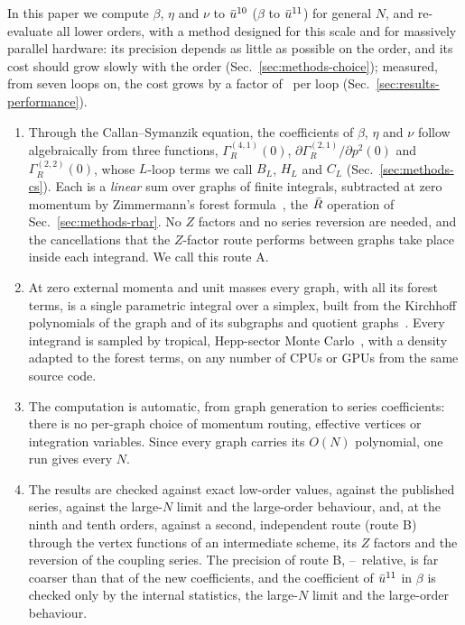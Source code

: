 In this paper we compute $\beta$, $\eta$ and $\nu$ to $\bar u^{10}$ ($\beta$ to $\bar u^{11}$) for general $N$, and
re-evaluate all lower orders, with a method designed for this scale and for massively parallel hardware: its
precision depends as little as possible on the order, and its cost should grow slowly with the order
(Sec.~\ref{sec:methods-choice}); measured, from seven loops on, the cost grows by a factor of \costgrowthrange\ per loop
(Sec.~\ref{sec:results-performance}).
\begin{enumerate}
\item Through the Callan--Symanzik equation, the coefficients of $\beta$, $\eta$ and $\nu$ follow algebraically from
three functions, $\Gamma^{(4,1)}_R(0)$, $\partial\Gamma^{(2,1)}_R/\partial p^2(0)$ and $\Gamma^{(2,2)}_R(0)$, whose $L$-loop
terms we call $B_L$, $H_L$ and $C_L$ (Sec.~\ref{sec:methods-cs}). Each is a \emph{linear} sum over graphs of finite
integrals, subtracted at zero momentum by Zimmermann's forest
formula~\cite{BogoliubovParasiuk1957,Hepp1966,Zimmermann1969,Zavialov1990}, the
$\bar R$ operation of Sec.~\ref{sec:methods-rbar}. No $Z$ factors and no series reversion are needed, and the
cancellations that the $Z$-factor route performs between graphs take place inside each integrand. We call this
route A.
\item At zero external momenta and unit masses every graph, with all its forest terms, is a single parametric
integral over a simplex, built from the Kirchhoff polynomials of the graph and of its subgraphs and quotient
graphs~\cite{BergereZuber1974,BergereLam1976,BrownKreimer2013}. Every integrand is sampled by tropical, Hepp-sector Monte
Carlo~\cite{Volkov2017,Borinsky2023tropical,Panzer2022Hepp,feyntrop2024,Borinsky2025global}, with a density adapted to the
forest terms, on any number of CPUs or GPUs from the same source code.
\item The computation is automatic, from graph generation to series coefficients: there is no per-graph choice of
momentum routing, effective vertices or integration variables. Since every graph carries its $O(N)$ polynomial, one
run gives every $N$.
\item The results are checked against exact low-order values, against the published series, against the large-$N$
limit and the large-order behaviour, and, at the ninth and tenth orders, against a second, independent route (route B)
through the vertex functions of an intermediate scheme, its $Z$ factors and the reversion of the coupling series. The
precision of route B, \routeBrelmin--\routeBrelmax\ relative, is far coarser than that of the new coefficients, and the
coefficient of $\bar u^{11}$ in $\beta$ is checked only by the internal statistics, the large-$N$ limit and the
large-order behaviour.
\end{enumerate}
